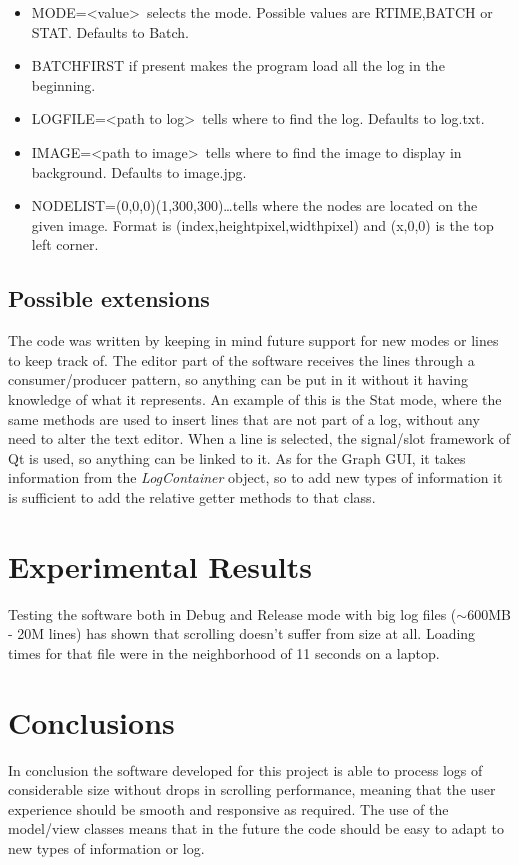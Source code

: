\begin{itemize}
	\item MODE=\textless value\textgreater \ selects the mode. Possible values are RTIME,BATCH or STAT. Defaults to Batch.
	
	\item BATCHFIRST if present makes the program load all the log in the beginning.
	
	\item LOGFILE=\textless path to log\textgreater \ tells where to find the log. Defaults to log.txt.
	
	\item IMAGE=\textless path to image\textgreater \ tells where to find the image to display in background. Defaults to image.jpg.
	
	\item NODELIST=(0,0,0)(1,300,300)\dots tells where the nodes are located on the given image. Format is (index,heightpixel,widthpixel) and (x,0,0) is the top left corner.
\end{itemize}

\subsection{Possible extensions}
The code was written by keeping in mind future support for new modes or lines to keep track of. The editor part of the software receives the lines through a consumer/producer pattern, so anything can be put in it without it having knowledge of what it represents. An example of this is the Stat mode, where the same methods are used to insert lines that are not part of a log, without any need to alter the text editor. When a line is selected, the signal/slot framework of Qt is used, so anything can be linked to it.
As for the Graph GUI, it takes information from the \textit{LogContainer} object, so to add new types of information it is sufficient to add the relative getter methods to that class.

\section{Experimental Results}
Testing the software both in Debug and Release mode with big log files ($\sim$600MB - 20M lines) has shown that scrolling doesn't suffer from size at all. Loading times for that file were in the neighborhood of 11 seconds on a laptop.
\section{Conclusions}
In conclusion the software developed for this project is able to process logs of considerable size without drops in scrolling performance, meaning that the user experience should be smooth and responsive as required. The use of the model/view classes means that in the future the code should be easy to adapt to new types of information or log.

